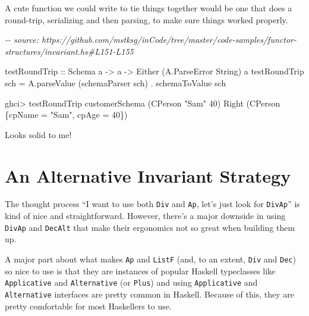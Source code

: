 \documentclass[]{article}
\newenvironment{Shaded}{}{}
\newcommand{\CommentTok}[1]{\textcolor[rgb]{0.38,0.63,0.69}{\textit{#1}}}
\newcommand{\DataTypeTok}[1]{\textcolor[rgb]{0.56,0.13,0.00}{#1}}
\newcommand{\DecValTok}[1]{\textcolor[rgb]{0.25,0.63,0.44}{#1}}
\newcommand{\NormalTok}[1]{#1}
\newcommand{\OperatorTok}[1]{\textcolor[rgb]{0.40,0.40,0.40}{#1}}
\newcommand{\OtherTok}[1]{\textcolor[rgb]{0.00,0.44,0.13}{#1}}
\newcommand{\StringTok}[1]{\textcolor[rgb]{0.25,0.44,0.63}{#1}}
\begin{document}
A cute function we could write to tie things together would be one that does a
round-trip, serializing and then parsing, to make sure things worked properly.

\begin{Shaded}
\begin{Highlighting}[]
\CommentTok{{-}{-} source: https://github.com/mstksg/inCode/tree/master/code{-}samples/functor{-}structures/invariant.hs\#L151{-}L155}

\NormalTok{testRoundTrip}
\OtherTok{    ::} \DataTypeTok{Schema}\NormalTok{ a}
    \OtherTok{{-}>}\NormalTok{ a}
    \OtherTok{{-}>} \DataTypeTok{Either}\NormalTok{ (}\DataTypeTok{A.ParseError} \DataTypeTok{String}\NormalTok{) a}
\NormalTok{testRoundTrip sch }\OtherTok{=}\NormalTok{ A.parseValue (schemaParser sch) }\OperatorTok{.}\NormalTok{ schemaToValue sch}
\end{Highlighting}
\end{Shaded}

\begin{Shaded}
\begin{Highlighting}[]
\NormalTok{ghci}\OperatorTok{>}\NormalTok{ testRoundTrip customerSchema (}\DataTypeTok{CPerson} \StringTok{"Sam"} \DecValTok{40}\NormalTok{)}
\DataTypeTok{Right}\NormalTok{ (}\DataTypeTok{CPerson}\NormalTok{ \{cpName }\OtherTok{=} \StringTok{"Sam"}\NormalTok{, cpAge }\OtherTok{=} \DecValTok{40}\NormalTok{\})}
\end{Highlighting}
\end{Shaded}

Looks solid to me!

\hypertarget{an-alternative-invariant-strategy}{%
\section{An Alternative Invariant
Strategy}\label{an-alternative-invariant-strategy}}

The thought process ``I want to use both \texttt{Div} and \texttt{Ap}, let's
just look for \texttt{DivAp}'' is kind of nice and straightforward. However,
there's a major downside in using \texttt{DivAp} and \texttt{DecAlt} that make
their ergonomics not so great when building them up.

A major part about what makes \texttt{Ap} and \texttt{ListF} (and, to an extent,
\texttt{Div} and \texttt{Dec}) so nice to use is that they are instances of
popular Haskell typeclasses like \texttt{Applicative} and \texttt{Alternative}
(or \texttt{Plus}) and using \texttt{Applicative} and \texttt{Alternative}
interfaces are pretty common in Haskell. Because of this, they are pretty
comfortable for most Haskellers to use.
\end{document}
